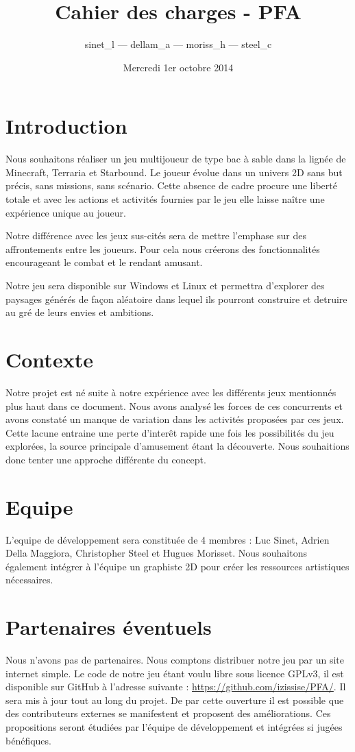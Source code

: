 \documentclass{article}
\begin{document}
\title{Cahier des charges - PFA}
\author{sinet\_l --- dellam\_a --- moriss\_h --- steel\_c}
\date{Mercredi 1er octobre 2014}
\maketitle
\section{Introduction}
Nous souhaitons réaliser un jeu multijoueur de type bac à sable
dans la lignée de Minecraft, Terraria et Starbound. Le joueur évolue
dans un univers 2D sans but précis, sans missions, sans scénario.
Cette absence de cadre procure une liberté totale et avec les actions
et activités fournies par le jeu elle laisse naître une expérience
unique au joueur.

Notre différence avec les jeux sus-cités sera de mettre l'emphase
sur des affrontements entre les joueurs. Pour cela nous créerons
des fonctionnalités encourageant le combat et le rendant amusant.

Notre jeu sera disponible sur Windows et Linux et permettra d'explorer
des paysages générés de façon aléatoire dans lequel ils pourront
construire et detruire au gré de leurs envies et ambitions.
\section{Contexte}
Notre projet est né suite à notre expérience avec les différents jeux
mentionnés plus haut dans ce document. Nous avons analysé les forces
de ces concurrents et avons constaté un manque de variation dans les
activités proposées par ces jeux. Cette lacune entraine une perte
d'interêt rapide une fois les possibilités du jeu explorées, la source
principale d'amusement étant la découverte. Nous souhaitions donc
tenter une approche différente du concept.
\section{Equipe}
L'equipe de développement sera constituée de 4 membres :
Luc Sinet, Adrien Della Maggiora, Christopher Steel et Hugues Morisset.
Nous souhaitons également intégrer à l'équipe un graphiste 2D pour
créer les ressources artistiques nécessaires.
\section{Partenaires éventuels}
Nous n'avons pas de partenaires. Nous comptons distribuer notre jeu
par un site internet simple. Le code de notre jeu étant voulu libre
sous licence GPLv3, il est disponible sur GitHub à l'adresse suivante :
\url{https://github.com/izissise/PFA/}. Il sera mis à jour tout au long
du projet. De par cette ouverture il est possible que des contributeurs
externes se manifestent et proposent des améliorations. Ces propositions
seront étudiées par l'équipe de développement et intégrées si jugées
bénéfiques.
\end{document}
